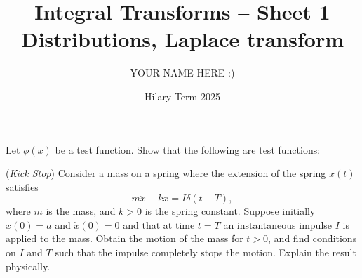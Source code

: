 \documentclass[answers]{exam}
\title{Integral Transforms -- Sheet 1\\Distributions, Laplace transform}
\author{YOUR NAME HERE :)}
\date{Hilary Term 2025}
\begin{document}
\maketitle
\begin{questions}

\question%
Let $\phi(x)$ be a test function. Show that the following are test functions:



\question%



\question%
(\emph{Kick Stop}) Consider a mass on a spring where the extension of the spring $x(t)$ satisfies \[
	m \ddot{x}+k x=I \delta(t-T),
\] where $m$ is the mass, and $k>0$ is the spring constant. Suppose initially $x(0)=a$ and $\dot{x}(0)=0$ and that at time $t=T$ an instantaneous impulse $I$ is applied to the mass. Obtain the motion of the mass for $t>0$, and find conditions on $I$ and $T$ such that the impulse completely stops the motion. Explain the result physically.




\end{questions}
\end{document}
